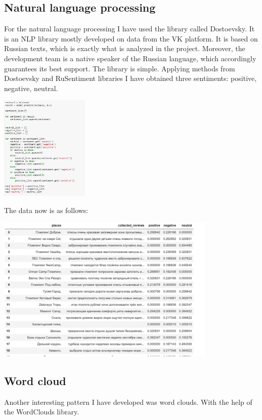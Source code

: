 \documentclass{article}
\begin{document}
\subsection{Natural language processing}
\setcounter{section}{9}
For the natural language processing I have used the library called Dostoevsky\cite{sysoev2021studying}. It is an NLP library mostly developed on data from the VK platform. It is based on Russian texts, which is exactly what is analyzed in the project. Moreover, the development team is a native speaker of the Russian language, which accordingly guarantees its best support.\cite{koltsova2016opinion} The library is simple.
\newline
Applying methods from Dostoevsky and RuSentiment libraries I have obtained three sentiments: positive, negative, neutral.\cite{feldman2020behind}


\begin{center}
\includegraphics[width=1\linewidth, height=5cm]{images/figure 9.jpg}
\end{center}

The data now is as follows:

\begin{center}
\includegraphics[width=1.2\linewidth, height=7cm]{images/figure 10.jpg}
\end{center}

\newpage
\subsection{Word cloud}
\setcounter{section}{9}
Another interesting pattern I have developed was word clouds. With the help of the WordClouds library. 
\end{document}
